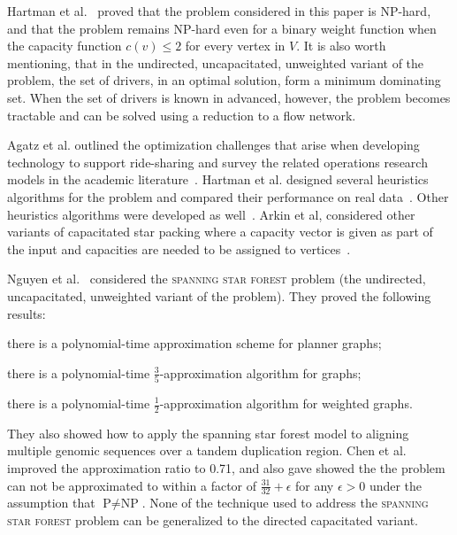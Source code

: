 Hartman et al.~\cite{hartman2013optimal} proved that the
\emph{\CARPOOL{}} problem considered in this paper is NP-hard,
and that the problem remains NP-hard even for a binary weight function when
the capacity function $c(v) \leq 2$ for every vertex in $V$.
It is also worth mentioning, that in the undirected, uncapacitated, unweighted
variant of the problem, the set of drivers, in an optimal solution,
form a minimum dominating set.
When the set of drivers is known in advanced, however, the problem becomes
tractable and can be solved using a reduction to a flow network.

Agatz et al. outlined the optimization challenges that arise 
when developing technology to support ride-sharing and survey the
related operations research models in the academic literature~\cite{agatz2012optimization}.  
Hartman et al. designed several heuristics algorithms for the 
\CARPOOL{} problem and compared 
their performance on real data~\cite{hartman2014theory}.
Other heuristics algorithms were developed as well~\cite{knapen2014exploiting}.
Arkin et al, considered other variants of capacitated star packing where
a capacity vector is given as part of the input and 
capacities are needed to be assigned to vertices~\cite{arkin2004approximations}.  

Nguyen et al.~\cite{nguyen2008approximating} considered the \textsc{spanning star forest} problem
(the undirected, uncapacitated, unweighted variant of the problem).
They proved the following results:
\begin{inparaenum}
\item
there is a polynomial-time approximation scheme for planner graphs;
\item 
there is a polynomial-time $\frac{3}{5}$-approximation algorithm for graphs;
\item 
there is a polynomial-time $\frac{1}{2}$-approximation algorithm for weighted graphs.
\end{inparaenum}
They also showed how to apply the spanning star forest model to aligning multiple
genomic sequences over a tandem duplication region.
Chen et al.~\cite{chen2007improved} improved the approximation ratio to 0.71,
and also gave showed the the problem can not be approximated to within a factor of
$\frac{31}{32} + \epsilon$ for any $\epsilon > 0$ under the assumption 
that $\text{P} \neq \text{NP}$.
None of the technique used to address the \textsc{spanning star forest} problem
can be generalized to the directed capacitated variant. 

